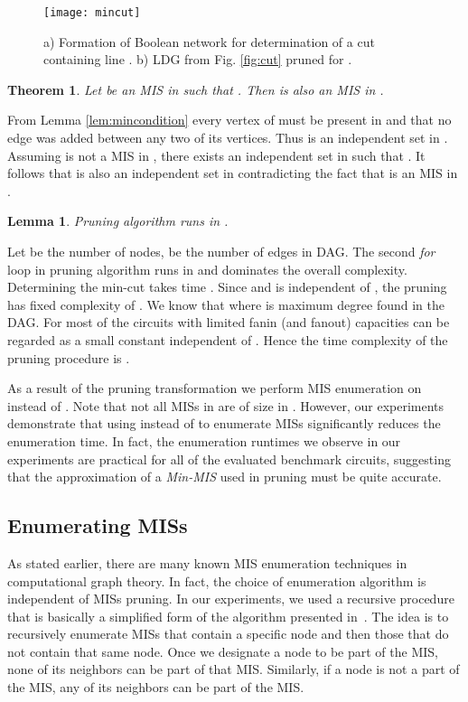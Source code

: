 \documentclass[journal]{IEEEtran}
\newtheorem{lemma}{Lemma}
\newtheorem{theorem}{Theorem}
\begin{document}
\begin{figure}[h]
\centering
\texttt{[image: mincut]}
\caption{a) Formation of  Boolean network for determination of a  cut containing line . b) LDG from Fig. \ref{fig:cut} pruned for
  .}
\label{fig:mincut}
\end{figure}

\begin{theorem}
\label{thm:main}
Let  be an MIS in  such that . Then  is also an MIS in .
\end{theorem}
\begin{IEEEproof}
From Lemma \ref{lem:mincondition} every vertex of  must be present in  and that no edge was added between any two of its vertices. Thus  is an independent set in . Assuming  is not a MIS in , there exists an independent set  in  such that . It follows that  is also an independent set in  contradicting the fact that  is an MIS in .
\end{IEEEproof}

\begin{lemma}
Pruning algorithm runs in .
\end{lemma}
\begin{IEEEproof}
Let  be the number of nodes,  be the number of edges in DAG. The second \emph{for} loop in pruning algorithm runs in  and dominates the overall complexity. Determining the min-cut takes  time \cite{cormen2001introduction}. Since  and is independent of , the pruning has fixed complexity of . We know that  where  is maximum degree found in the  DAG. For most of the circuits with limited fanin (and fanout) capacities  can be regarded as a small constant independent of . Hence the time complexity of the pruning procedure is .
\end{IEEEproof}

As a result of the pruning transformation we perform MIS enumeration on  instead of . Note that not all MISs in  are of size  in . However, our experiments demonstrate that using  instead of  to enumerate MISs significantly reduces the enumeration time. In fact, the enumeration runtimes we observe in our experiments are practical for all of the evaluated benchmark circuits, suggesting that the approximation of a \emph{Min-MIS} used in pruning must be quite accurate.

\subsection{Enumerating MISs}

As stated earlier,  there are many known MIS enumeration techniques in computational graph theory.  In fact, the choice of enumeration algorithm is independent of  MISs pruning. In our experiments, we used a recursive procedure that is basically a simplified form of the algorithm presented in~\cite{byskov2003algorithms}. The idea is to recursively enumerate MISs that contain a specific node and then those that do not contain that same node. Once we designate a node to be part of the MIS, none of its neighbors can be part of that MIS. Similarly, if a node is not a part of the MIS, any of its neighbors can be part of the MIS. 
\end{document}
